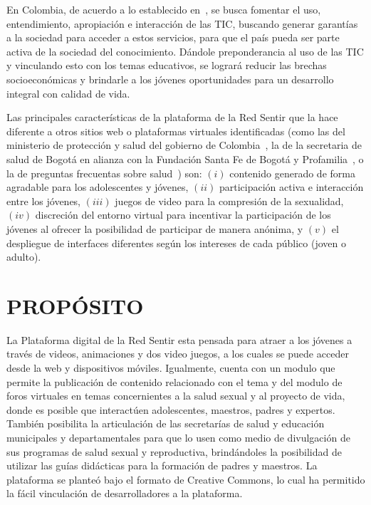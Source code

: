 \documentclass[journal,transmag]{IEEEtran}
\begin{document}
En Colombia, de acuerdo a lo establecido en~\cite{Plan2014}, se busca fomentar el uso, entendimiento, apropiación e interacción de las TIC, buscando generar garantías a la sociedad para acceder a estos servicios, para que el país pueda ser parte activa de la sociedad del conocimiento. Dándole preponderancia al uso de las TIC y vinculando esto con los temas educativos, se logrará reducir las brechas socioeconómicas y brindarle a los jóvenes oportunidades para un desarrollo integral con calidad de vida.

Las principales características de la plataforma de la Red Sentir que la hace diferente a otros sitios web o plataformas virtuales identificadas (como las del ministerio de protección y salud del gobierno de Colombia~\cite{PagGob2018}, la de la secretaria de salud de Bogotá en alianza con la Fundación Santa Fe de Bogotá y Profamilia~\cite{Sexperto2018}, o la de preguntas frecuentas sobre salud~\cite{1DOC3}) son: $(i)$ contenido generado de forma agradable para los adolescentes y jóvenes, $(ii)$ participación activa e interacción entre los jóvenes, $(iii)$ juegos de video para la compresión de la sexualidad, $(iv)$ discreción del entorno virtual para incentivar la participación de los jóvenes al ofrecer la posibilidad de participar de manera anónima, y $(v)$ el despliegue de interfaces diferentes según los intereses de cada público (joven o adulto).  

\section{PROPÓSITO}\label{sec:propositos}

La Plataforma digital de la Red Sentir esta pensada para atraer a los jóvenes a través de videos, animaciones y dos video juegos, a los cuales se puede acceder desde la web y dispositivos móviles.  Igualmente, cuenta con un modulo que permite la publicación de contenido relacionado con el tema y del modulo de foros virtuales en temas concernientes a la salud sexual y al proyecto de vida, donde es posible que interactúen adolescentes, maestros, padres y expertos. También posibilita la articulación de las secretarías de salud y educación municipales y departamentales para que lo usen como medio de divulgación de sus programas de salud sexual y reproductiva, brindándoles la posibilidad de utilizar las guías didácticas para la formación de padres y maestros. La plataforma se planteó bajo el formato de Creative Commons, lo cual ha permitido la fácil vinculación de desarrolladores a la plataforma.
\end{document}
